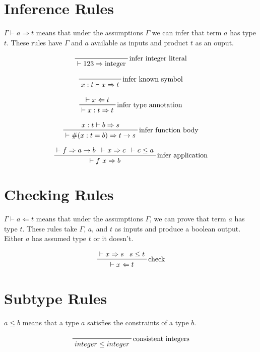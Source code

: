 \documentclass[11pt]{article}
\newcommand{\subtype}{\leq}
\newcommand{\infers}{\Rightarrow}
\newcommand{\checks}{\Leftarrow}
\newcommand{\context}{\vdash}
\begin{document}
\section{Inference Rules}

$\Gamma \vdash a \infers t$ means that under the assumptions $\Gamma$ we can infer that term $a$ has type $t$. These rules have $\Gamma$ and $a$ available as inputs and product $t$ as an ouput.

$$
\prfbyaxiom
	{infer integer literal}
	{\context 123 \infers \textnormal{integer}}
$$

$$
\prfbyaxiom
	{infer known symbol}
	{x : t \context x \infers t}
$$

$$
\prftree[r]
	{infer type annotation}
	{\context x \checks t}
	{\context x : t \infers t}
$$

$$
\prftree[r]
	{infer function body}
	{x:t \context b \infers s}
	{\context \#(x : t = b) \infers t \rightarrow s}
$$

$$
\prftree[r]
	{infer application}
	{\context f \infers a \rightarrow b}
	{\context x \infers c}
	{\context c \subtype a}
	{\context f \ x \infers b}
$$

\section{Checking Rules}

$\Gamma \context a \checks t$ means that under the assumptions $\Gamma$, we can prove that term $a$ has type $t$. These rules take $\Gamma$, $a$, and $t$ as inputs and produce a boolean output. Either $a$ has assumed type $t$ or it doesn't.

$$
\prftree[r]
	{check}
	{\context x \infers s}
	{s \subtype t}
	{\context x \checks t}
$$

\section{Subtype Rules}

$a \subtype b$ means that a type $a$ satisfies the constraints of a type $b$.

$$
\prfbyaxiom
	{consistent integers}
	{integer \subtype integer}
$$
\end{document}
